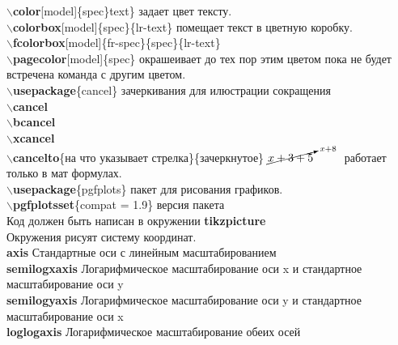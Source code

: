 \documentclass{article}
\newcommand{\bs}{$\backslash$}
\newcommand{\bd}[1]{{\bfseries #1}} %
\newcommand{\bb}[1]{\bd{\bs #1}} %
\begin{document}
{\bb{color}[model]\{spec\}text\} {\color[rgb]{0,1,0}задает цвет тексту.}\\
\bb{colorbox}[model]\{spec\}\{lr-text\}
\colorbox[rgb]{0,0,1}{помещает текст в цветную коробку.}\\
\bb{fcolorbox}[model]\{fr-spec\}\{spec\}\{lr-text\}
\\
\bb{pagecolor}[model]\{spec\} окрашеивает до тех пор этим цветом
пока не будет встречена команда с другим цветом.\\

\bb{usepackage}\{cancel\} зачеркивания для илюстрации сокращения\\
\bb{cancel} \\
\bb{bcancel} \\
\bb{xcancel} \\
\bb{cancelto}\{на что указывает стрелка\}\{зачеркнутое\}
$\cancelto{x+8}{x+3+5}$ ~~~~ работает только в мат формулах.\\

\bb{usepackage}\{pgfplots\} пакет для рисования графиков.\\
\bb{pgfplotsset}\{compat = 1.9\} версия пакета\\
Код должен быть написан в окружении \bd{tikzpicture}\\
Окружения рисуят систему координат.\\
\bd{axis} Стандартные оси с линейным масштабированием\\
\bd{semilogxaxis} Логарифмическое масштабирование оси x
и стандартное масштабирование оси y\\
\bd{semilogyaxis} Логарифмическое масштабирование оси y
и стандартное масштабирование оси x\\
\bd{loglogaxis} Логарифмическое масштабирование обеих осей\\

}
\end{document}
